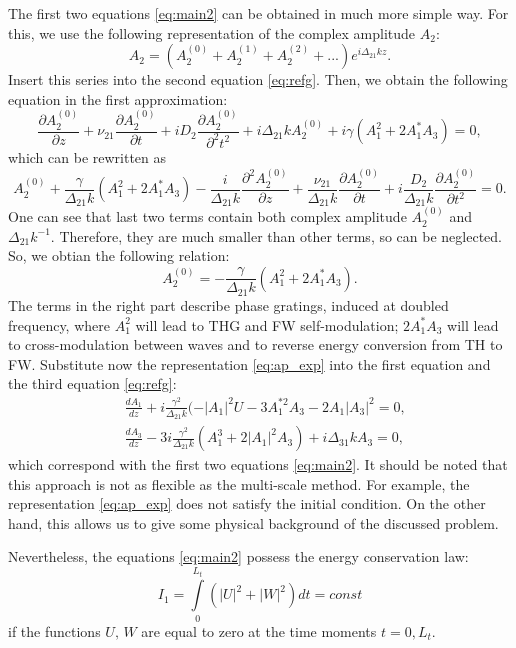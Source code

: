 \documentclass[a4paper, 12pt, onecolumn]{extarticle}
\begin{document}
The first two equations \eqref{eq:main2} can be obtained in much more simple way. For this, we use the following representation of the complex amplitude $A_2$:
$$
A_2=(A_2^{(0)}+A_2^{(1)}+A_2^{(2)}+...)e^{i\Delta_{21}kz}.
$$
Insert this series into the second equation \eqref{eq:refg}. Then, we obtain the following equation in the first approximation:
$$
\frac{\partial A_2^{(0)}}{\partial z}+\nu_{21}\frac{\partial A_{2}^{(0)}}{\partial t}+iD_2\frac{\partial A_2^{(0)}}{\partial^2 t^2}+i\Delta_{21}kA_2^{(0)}+i\gamma(A_1^2+2A_1^*A_3)=0,
$$
which can be rewritten as
$$
A_2^{(0)}+\frac{\gamma}{\Delta_{21}k}(A_1^2+2A_1^*A_3)-\frac{i}{\Delta_{21}k}\frac{\partial^2 A_2^{(0)}}{\partial z}+\frac{\nu_{21}}{\Delta_{21}k}\frac{\partial A_{2}^{(0)}}{\partial t}+i\frac{D_2}{\Delta_{21}k}\frac{\partial A_2^{(0)}}{\partial t^2}=0.
$$
One can see that last two terms contain both complex amplitude $A_2^{(0)}$ and $\Delta_{21}k^{-1}$. Therefore, they are much smaller than other terms, so can be neglected. So, we obtian the following relation:
\begin{equation}
\label{eq:ap_exp}
A_2^{(0)}=-\frac{\gamma}{\Delta_{21}k}(A_1^2+2A_1^*A_3).
\end{equation}
The terms in the right part describe phase gratings, induced at doubled frequency, where $A_1^2$ will lead to THG and FW self-modulation; $2A_1^*A_3$ will lead to cross-modulation between waves and to reverse energy conversion from TH to FW. Substitute now the representation \eqref{eq:ap_exp} into the first equation and the third equation \eqref{eq:refg}:
$$
\begin{aligned}
&\frac{d{A_1}}{d{z}}+i\frac{\gamma^2}{\Delta_{21} k}(-|A_1|^2U-3A_1^{*2}A_3-2A_1|A_3|^2=0,\\
&\frac{d{A_3}}{d{z}}-3i\frac{\gamma^2}{\Delta_{21} k}(A_1^3+2|A_1|^2A_3)+i\Delta_{31}kA_3=0,
\end{aligned}
$$
which correspond with the first two equations \eqref{eq:main2}. It should be noted that this approach is not as flexible as the multi-scale method. For example, the representation \eqref{eq:ap_exp} does not satisfy the initial condition. On the other hand, this allows us to give some physical background of the discussed problem.

Nevertheless, the equations  \eqref{eq:main2} possess the energy conservation law: 
\begin{equation}
\label{eq:ninv1}
I_1=\int\limits_0^{L_t}\left(|U|^2+|W|^2\right)dt=const
\end{equation}
if the functions \(U,\,W\) are equal to zero at the time moments \(t=0,L_t\).  
\end{document}
